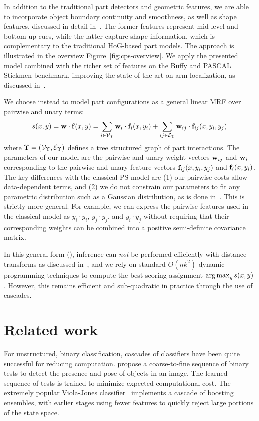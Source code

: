 In addition to the traditional part detectors and geometric features, we are 
able to incorporate object boundary continuity and smoothness, as well as shape 
features, discussed in detail in~. The former features 
represent mid-level and bottom-up cues, while the latter capture shape 
information, which is complementary to the traditional HoG-based part models.  
The approach is illustrated in the overview Figure~\ref{fig:cps-overview}. We 
apply the presented \CPS model combined with the richer set of features on the 
Buffy and PASCAL Stickmen benchmark, improving the state-of-the-art on arm 
localization, as discussed in~. 

\label{subsec:our_ps}
We choose instead to model part configurations as a general linear MRF over 
pairwise and unary terms:
\begin{align}
s(x,y)  = \mathbf{w} \cdot \mathbf{f}(x,y) = \sum_{i \in \mathcal{V}_\Upsilon} \mathbf{w}_i \cdot \mathbf{f}_i(x,y_i)  + 
\sum_{ij \in \mathcal{E}_\Upsilon} \mathbf{w}_{ij} \cdot \mathbf{f}_{ij}(x,y_i,y_j)
\label{eq:cps}
\end{align}
where $\Upsilon = (\mathcal{V}_\Upsilon,\mathcal{E}_\Upsilon)$ defines a tree structured graph of part 
interactions.  The parameters of our model are the pairwise and unary weight 
vectors $\mathbf{w}_{ij}$ and $\mathbf{w}_i$ corresponding to the pairwise and unary feature 
vectors $\mathbf{f}_{ij}(x,y_i,y_j)$ and $\mathbf{f}_i(x,y_i)$.   The key differences with the 
classical PS model are (1) our pairwise costs allow data-dependent terms, and 
(2) we do not constrain our parameters to fit any parametric distribution such 
as a Gaussian distribution, as is done 
in~\citet{felz05,devacrf,andriluka09,eichner09}.  This is strictly more 
general.  For example, we can express the pairwise features used in the 
classical model as $y_{i} \cdot y_{i}$, $y_{j}\cdot y_{j}$, and $y_{i}\cdot 
y_{j}$ without requiring that their corresponding weights can be combined into 
a positive semi-definite covariance matrix.

In this general form (), inference can {\em not} be performed 
efficiently with distance transforms as discussed 
in~, and we rely on standard $O(nk^2)$ dynamic programming 
techniques to compute the best scoring assignment $\mathop{\arg\max}_y s(x,y)$.  However, this remains efficient and sub-quadratic in practice through the use of cascades.

\section{Related work}
For unstructured, binary classification, cascades of classifiers have been 
quite successful for reducing computation.  \citet{geman2001} propose a 
coarse-to-fine sequence of binary tests to detect the presence and pose of 
objects in an image.  The learned sequence of tests is trained to minimize 
expected computational cost.  The extremely popular Viola-Jones 
classifier~\citep{viola02} implements a cascade of boosting ensembles, with 
earlier stages using fewer features to quickly reject large portions of the 
state space.

